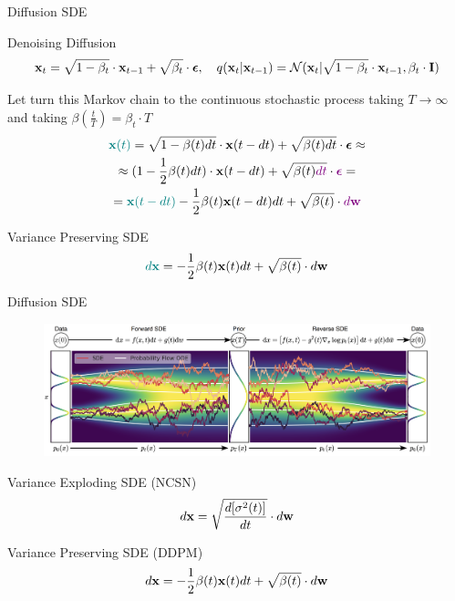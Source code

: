 \begin{frame}{Diffusion SDE}
	\begin{block}{Denoising Diffusion}
		\vspace{-0.5cm}
		\[
			\mathbf{x}_t = \sqrt{1 - \beta_t} \cdot \mathbf{x}_{t - 1} + \sqrt{\beta_t} \cdot \boldsymbol{\epsilon}, \quad q(\mathbf{x}_t | \mathbf{x}_{t-1}) = \mathcal{N}(\mathbf{x}_t | \sqrt{1 - \beta_t} \cdot \mathbf{x}_{t-1}, \beta_t \cdot \mathbf{I})
		\]
		\vspace{-0.5cm}
	\end{block}
	Let turn this Markov chain to the continuous stochastic process taking $T \rightarrow \infty$ and taking $\beta(\frac{t}{T}) = \beta_t \cdot T$
	\begin{multline*}
		{\color{teal}\mathbf{x}(t)} = \sqrt{1 - \beta(t) dt} \cdot \mathbf{x}(t - dt) + \sqrt{\beta(t)dt} \cdot \boldsymbol{\epsilon} \approx \\
		\approx (1 - \frac{1}{2} \beta(t) dt) \cdot \mathbf{x}(t - dt) + \sqrt{\beta(t){\color{violet}dt}} \cdot {\color{violet}\boldsymbol{\epsilon}} = \\
		= {\color{teal}\mathbf{x}(t - dt)} - \frac{1}{2} \beta(t) \mathbf{x}(t - dt) dt  + \sqrt{\beta(t)} \cdot {\color{violet}d \mathbf{w}}
	\end{multline*}
	\vspace{-0.5cm}
	\begin{block}{Variance Preserving SDE}
		\vspace{-0.3cm}
		\[
			{\color{teal}d \mathbf{x}} = - \frac{1}{2} \beta(t) \mathbf{x}(t) dt + \sqrt{\beta(t)} \cdot d \mathbf{w}
		\]
	\end{block}
\end{frame}
\begin{frame}{Diffusion SDE}
	\begin{figure}
		\includegraphics[width=\linewidth]{figs/sde}
	\end{figure}
	\vspace{-0.3cm}
	\begin{block}{Variance Exploding SDE (NCSN)}
		\vspace{-0.3cm}
		\[
			d \mathbf{x} = \sqrt{\frac{ d [\sigma^2(t)]}{dt}} \cdot d \mathbf{w}
		\]
		\vspace{-0.3cm}
	\end{block}
	\begin{block}{Variance Preserving SDE (DDPM)}
		\vspace{-0.3cm}
		\[
			d \mathbf{x} = - \frac{1}{2} \beta(t) \mathbf{x}(t) dt + \sqrt{\beta(t)} \cdot d \mathbf{w}
		\]
	\end{block}
\end{frame}

